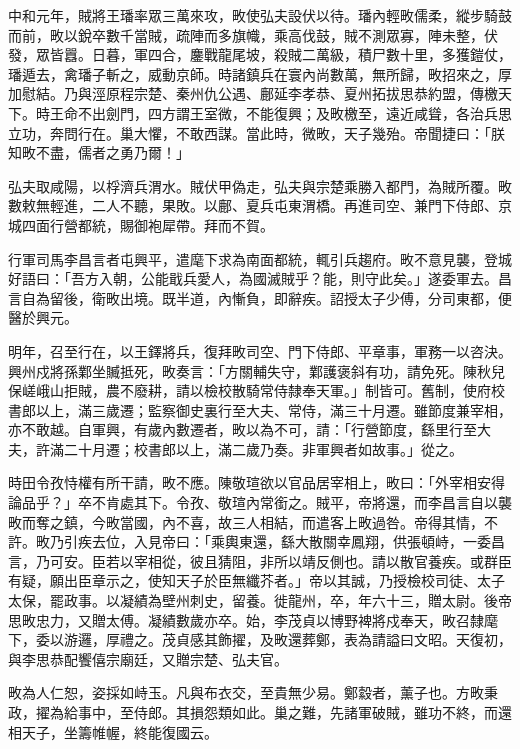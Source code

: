 \begin{pinyinscope}
 中和元年，賊將王璠率眾三萬來攻，畋使弘夫設伏以待。璠內輕畋儒柔，縱步騎鼓而前，畋以銳卒數千當賊，疏陣而多旗幟，乘高伐鼓，賊不測眾寡，陣未整，伏發，眾皆囂。日暮，軍四合，鏖戰龍尾坡，殺賊二萬級，積尸數十里，多獲鎧仗，璠遁去，禽璠子斬之，威動京師。時諸鎮兵在寰內尚數萬，無所歸，畋招來之，厚加慰結。乃與涇原程宗楚、秦州仇公遇、鄜延李孝恭、夏州拓拔思恭約盟，傳檄天下。時王命不出劍門，四方謂王室微，不能復興；及畋檄至，遠近咸聳，各治兵思立功，奔問行在。巢大懼，不敢西謀。當此時，微畋，天子幾殆。帝聞捷曰：「朕知畋不盡，儒者之勇乃爾！」



 弘夫取咸陽，以桴濟兵渭水。賊伏甲偽走，弘夫與宗楚乘勝入都門，為賊所覆。畋數敕無輕進，二人不聽，果敗。以鄜、夏兵屯東渭橋。再進司空、兼門下侍郎、京城四面行營都統，賜御袍犀帶。拜而不賀。



 行軍司馬李昌言者屯興平，遣麾下求為南面都統，輒引兵趨府。畋不意見襲，登城好語曰：「吾方入朝，公能戢兵愛人，為國滅賊乎？能，則守此矣。」遂委軍去。昌言自為留後，衛畋出境。既半道，內慚負，即辭疾。詔授太子少傅，分司東都，便醫於興元。



 明年，召至行在，以王鐸將兵，復拜畋司空、門下侍郎、平章事，軍務一以咨決。興州戍將孫鄴坐贓抵死，畋奏言：「方關輔失守，鄴護褒斜有功，請免死。陳秋兒保嵯峨山拒賊，農不廢耕，請以檢校散騎常侍隸奉天軍。」制皆可。舊制，使府校書郎以上，滿三歲遷；監察御史裏行至大夫、常侍，滿三十月遷。雖節度兼宰相，亦不敢越。自軍興，有歲內數遷者，畋以為不可，請：「行營節度，繇里行至大夫，許滿二十月遷；校書郎以上，滿二歲乃奏。非軍興者如故事。」從之。



 時田令孜恃權有所干請，畋不應。陳敬瑄欲以官品居宰相上，畋曰：「外宰相安得論品乎？」卒不肯處其下。令孜、敬瑄內常銜之。賊平，帝將還，而李昌言自以襲畋而奪之鎮，今畋當國，內不喜，故三人相結，而遣客上畋過咎。帝得其情，不許。畋乃引疾去位，入見帝曰：「乘輿東還，繇大散關幸鳳翔，供張頓峙，一委昌言，乃可安。臣若以宰相從，彼且猜阻，非所以靖反側也。請以散官養疾。或群臣有疑，願出臣章示之，使知天子於臣無纖芥者。」帝以其誠，乃授檢校司徒、太子太保，罷政事。以凝績為壁州刺史，留養。徙龍州，卒，年六十三，贈太尉。後帝思畋忠力，又贈太傅。凝績數歲亦卒。始，李茂貞以博野裨將戍奉天，畋召隸麾下，委以游邏，厚禮之。茂貞感其飾擢，及畋還葬鄭，表為請謚曰文昭。天復初，與李思恭配饗僖宗廟廷，又贈宗楚、弘夫官。



 畋為人仁恕，姿採如峙玉。凡與布衣交，至貴無少易。鄭縠者，薰子也。方畋秉政，擢為給事中，至侍郎。其損怨類如此。巢之難，先諸軍破賊，雖功不終，而還相天子，坐籌帷幄，終能復國云。




\end{pinyinscope}
